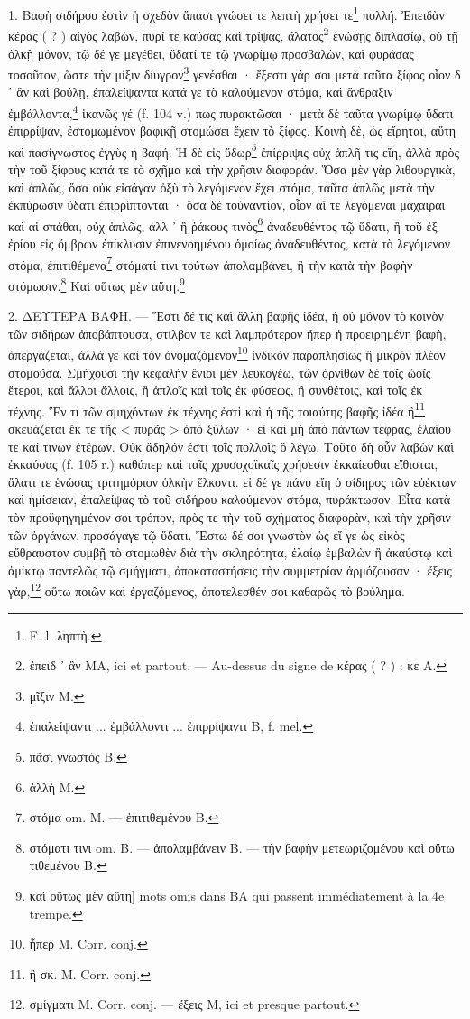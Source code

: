 \documentclass[a4paper, 11pt, oneside, polutonikogreek, french]{article}
\begin{document}
1. Βαφὴ σιδήρου ἐστὶν ἡ σχεδὸν ἅπασι γνώσει τε λεπτὴ χρήσει τε\footnote{F. l. ληπτὴ.} πολλή. Ἐπειδὰν κέρας ( ? ) αἰγὸς λαβὼν, πυρί τε καύσας καὶ τρίψας, ἅλατος\footnote{ἐπειδ ᾽ ἂν MA, ici et partout. --- Au-dessus du signe de κέρας ( ? ) : κε A.} ἑνώσῃς διπλασίῳ, οὐ τῇ ὁλκῇ μόνον, τῷ δέ γε μεγέθει, ὕδατί τε τῷ γνωρίμῳ προσβαλὼν, καὶ φυράσας τοσοῦτον, ὥστε τὴν μίξιν δίυγρον\footnote{μῖξιν M.} γενέσθαι · ἔξεστι γάρ σοι μετὰ ταῦτα ξίφος οἷον δ ᾽ ἂν καὶ βούλῃ, ἐπαλείψαντα κατά γε τὸ καλούμενον στόμα, καὶ ἄνθραξιν ἐμβάλλοντα,\footnote{ἐπαλείψαντι ... ἐμβάλλοντι ... ἐπιρρίψαντι B, f. mel.} ἱκανῶς γέ (f. 104 v.) πως πυρακτῶσαι · μετὰ δὲ ταῦτα γνωρίμῳ ὕδατι ἐπιρρίψαν, ἐστομωμένον βαφικῇ στομώσει ἔχειν τὸ ξίφος. Κοινὴ δὲ, ὡς εἴρηται, αὕτη καὶ πασίγνωστος ἐγγὺς ἡ βαφή. Ἡ δὲ εἰς ὕδωρ\footnote{πᾶσι γνωστὸς B.} ἐπίρριψις οὐχ ἁπλῆ τις εἴη, ἀλλὰ πρὸς τὴν τοῦ ξίφους κατά τε τὸ σχῆμα καὶ τὴν χρῆσιν διαφοράν. Ὅσα μὲν γὰρ λιθουργικὰ, καὶ ἁπλῶς, ὅσα οὐκ εἰσάγαν ὀξὺ τὸ λεγόμενον ἔχει στόμα, ταῦτα ἁπλῶς μετὰ τὴν ἐκπύρωσιν ὕδατι ἐπιρρίπτονται · ὅσα δὲ τοὐναντίον, οἷον αἵ τε λεγόμεναι μάχαιραι καὶ αἱ σπάθαι, οὐχ ἁπλῶς, ἀλλ ᾽ ἢ ῥάκους τινὸς\footnote{ἀλλὴ M.} ἀναδευθέντος τῷ ὕδατι, ἢ τοῦ ἐξ ἐρίου εἰς ὄμβρων ἐπίκλυσιν ἐπινενοημένου ὁμοίως ἀναδευθέντος, κατὰ τὸ λεγόμενον στόμα, ἐπιτιθέμενα\footnote{στόμα om. M. --- ἐπιτιθεμένου B.} στόματί τινι τούτων ἀπολαμβάνει, ἢ τὴν κατὰ τὴν βαφὴν στόμωσιν.\footnote{στόματι τινι om. B. --- ἀπολαμβάνειν B. --- τὴν βαφὴν μετεωριζομένου καὶ οὕτω τιθεμένου B.} Καὶ οὕτως μὲν αὕτη.\footnote{καὶ οὕτως μὲν αὕτη] mots omis dans BA qui passent immédiatement à la 4e trempe.}

2. ΔΕΥΤΕΡΑ ΒΑΦΗ. --- Ἔστι δέ τις καὶ ἄλλη βαφῆς ἰδέα, ἡ οὐ μόνον τὸ κοινὸν τῶν σιδήρων ἀποβάπτουσα, στίλβον τε καὶ λαμπρότερον ἤπερ ἡ προειρημένη βαφὴ, ἀπεργάζεται, ἀλλά γε καὶ τὸν ὀνομαζόμενον\footnote{ἧπερ M. Corr. conj.} ἰνδικὸν παραπλησίως ἢ μικρὸν πλέον στομοῦσα. Σμήχουσι τὴν κεφαλὴν ἔνιοι μὲν λευκογέω, τῶν ὀρνίθων δὲ τοῖς ὠοῖς ἕτεροι, καὶ ἄλλοι ἄλλοις, ἢ ἁπλοῖς καὶ τοῖς ἐκ φύσεως, ἢ συνθέτοις, καὶ τοῖς ἐκ τέχνης. Ἕν τι τῶν σμηχόντων ἐκ τέχνης ἐστὶ καὶ ἡ τῆς τοιαύτης βαφῆς ἰδέα ἣ\footnote{ἢ σκ. M. Corr. conj.} σκευάζεται ἔκ τε τῆς < πυρᾶς > ἀπὸ ξύλων · εἰ καὶ μὴ ἀπὸ πάντων τέφρας, ἐλαίου τε καί τινων ἑτέρων. Οὐκ ἄδηλόν ἐστι τοῖς πολλοῖς ὃ λέγω. Τοῦτο δὴ οὖν λαβὼν καὶ ἐκκαύσας (f. 105 r.) καθάπερ καὶ ταῖς χρυσοχοϊκαῖς χρήσεσιν ἐκκαίεσθαι εἴθισται, ἅλατι τε ἑνώσας τριτημόριον ὁλκὴν ἕλκοντι. εἰ δέ γε πάνυ εἴη ὁ σίδηρος τῶν εὐέκτων καὶ ἡμίσειαν, ἐπαλείψας τὸ τοῦ σιδήρου καλούμενον στόμα, πυράκτωσον. Εἶτα κατὰ τὸν προϋφηγημένον σοι τρόπον, πρὸς τε τὴν τοῦ σχήματος διαφορὰν, καὶ τὴν χρῆσιν τῶν ὀργάνων, προσάγαγε τῷ ὕδατι. Ἔστω δέ σοι γνωστὸν ὡς εἴ γε ὡς εἰκὸς εὔθραυστον συμβῇ τὸ στομωθὲν διὰ τὴν σκληρότητα, ἐλαίῳ ἐμβαλὼν ἢ ἀκαύστῳ καὶ ἀμίκτῳ παντελῶς τῷ σμήγματι, ἀποκαταστήσεις τὴν συμμετρίαν ἁρμόζουσαν · ἕξεις γὰρ,\footnote{σμίγματι M. Corr. conj. --- ἔξεις M, ici et presque partout.} οὕτω ποιῶν καὶ ἐργαζόμενος, ἀποτελεσθέν σοι καθαρῶς τὸ βούλημα.
\end{document}
